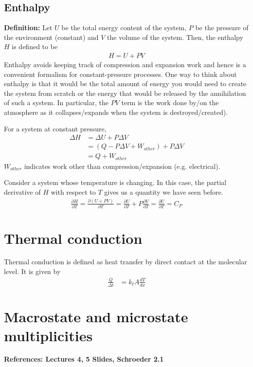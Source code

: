 \documentclass[11pt]{article}
\begin{document}
\subsection{Enthalpy}
\textbf{Definition:} Let $U$ be the total energy content of the system, $P$ be the pressure of the environment (constant) and $V$ the volume of the system. Then, the enthalpy $H$ is defined to be 
\begin{align*}
    H = U + PV 
\end{align*}
Enthalpy avoids keeping track of compression and expansion work and hence is a convenient formalism for constant-pressure processes. One way to think about enthalpy is that it would be the total amount of energy you would need to create the system from scratch or the energy that would be released by the annihilation of such a system. In particular, the $PV$ term is the work done by/on the atmosphere as it collapses/expands when the system is destroyed/created). 

For a system at constant pressure, 
\begin{align*}
    \Delta H &= \Delta U + P \Delta V \\
    &= (Q - P \Delta V + W_{other}) + P \Delta V \\
    &= Q + W_{other}
\end{align*}
$W_{other}$ indicates work other than compression/expansion (e.g. electrical). 

Consider a system whose temperature is changing. In this case, the partial derivative of $H$ with respect to $T$ gives us a quantity we have seen before. 
\begin{align*}
    \frac{\partial H}{\partial T} = \frac{\partial (U+PV)}{\partial T} = \frac{\partial U}{\partial T} + P \frac{\partial V}{\partial T} = \frac{\partial U}{\partial T} = C_P 
\end{align*}

\section{Thermal conduction}
Thermal conduction is defined as heat transfer by direct contact at the molecular level. It is given by
\begin{align*}
    \frac{Q}{\Delta t} &= k_t A \frac{dT}{dx}
\end{align*}

\section{Macrostate and microstate multiplicities}
\textbf{References: Lectures 4, 5 Slides, Schroeder 2.1}
\end{document}
